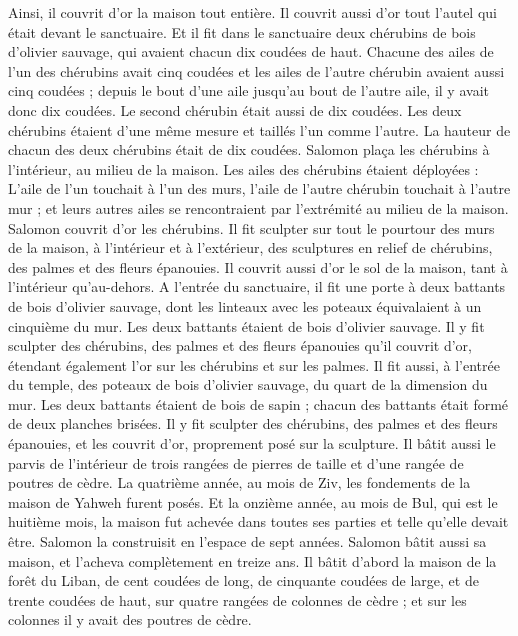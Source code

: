 \begin{multicols}{2}
Ainsi, il couvrit d'or la maison tout entière. Il couvrit aussi d'or tout l'autel qui était devant le sanctuaire.
Et il fit dans le sanctuaire deux chérubins de bois d'olivier sauvage, qui avaient chacun dix coudées de haut.
Chacune des ailes de l'un des chérubins avait cinq coudées et les ailes de l'autre chérubin avaient aussi cinq coudées ; depuis le bout d'une aile jusqu'au bout de l'autre aile, il y avait donc dix coudées.
Le second chérubin était aussi de dix coudées. Les deux chérubins étaient d'une même mesure et taillés l'un comme l'autre.
La hauteur de chacun des deux chérubins était de dix coudées.
Salomon plaça les chérubins à l'intérieur, au milieu de la maison. Les ailes des chérubins étaient déployées : L'aile de l'un touchait à l'un des murs, l'aile de l'autre chérubin touchait à l'autre mur ; et leurs autres ailes se rencontraient par l'extrémité au milieu de la maison.
Salomon couvrit d'or les chérubins.
Il fit sculpter sur tout le pourtour des murs de la maison, à l'intérieur et à l'extérieur, des sculptures en relief de chérubins, des palmes et des fleurs épanouies.
Il couvrit aussi d'or le sol de la maison, tant à l'intérieur qu'au-dehors.
A l'entrée du sanctuaire, il fit une porte à deux battants de bois d'olivier sauvage, dont les linteaux avec les poteaux équivalaient à un cinquième du mur.
Les deux battants étaient de bois d'olivier sauvage. Il y fit sculpter des chérubins, des palmes et des fleurs épanouies qu'il couvrit d'or, étendant également l'or sur les chérubins et sur les palmes.
Il fit aussi, à l'entrée du temple, des poteaux de bois d'olivier sauvage, du quart de la dimension du mur.
Les deux battants étaient de bois de sapin ; chacun des battants était formé de deux planches brisées.
Il y fit sculpter des chérubins, des palmes et des fleurs épanouies, et les couvrit d'or, proprement posé sur la sculpture.
Il bâtit aussi le parvis de l'intérieur de trois rangées de pierres de taille et d'une rangée de poutres de cèdre.
La quatrième année, au mois de Ziv, les fondements de la maison de Yahweh furent posés.
Et la onzième année, au mois de Bul, qui est le huitième mois, la maison fut achevée dans toutes ses parties et telle qu'elle devait être. Salomon la construisit en l'espace de sept années.
\VerseOne{}Salomon bâtit aussi sa maison, et l'acheva complètement en treize ans.
Il bâtit d'abord la maison de la forêt du Liban, de cent coudées de long, de cinquante coudées de large, et de trente coudées de haut, sur quatre rangées de colonnes de cèdre ; et sur les colonnes il y avait des poutres de cèdre.

\end{multicols}
